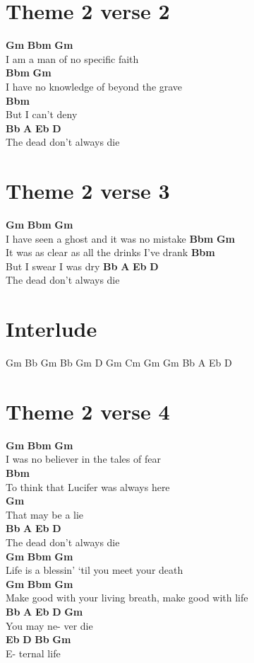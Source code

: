\documentclass{article}
\begin{document}
\section*{Theme 2 verse 2}
\textbf{Gm}     \textbf{Bbm}                \textbf{Gm}\\
I am a man of no specific faith\\
\textbf{Bbm}                     \textbf{Gm}\\
I have no knowledge of beyond the grave\\
\textbf{Bbm}\\
But I can’t deny\\
\textbf{Bb}         \textbf{A}      \textbf{Eb} \textbf{D}\\
The dead don’t always die

\section*{Theme 2 verse 3}
\textbf{Gm}            \textbf{Bbm}                    \textbf{Gm}\\
I have seen a ghost and it was no mistake
\textbf{Bbm}                          \textbf{Gm}\\
It was as clear as all the drinks I’ve drank
\textbf{Bbm}\\
But I swear I was dry
\textbf{Bb}         \textbf{A}      \textbf{Eb} \textbf{D}\\
The dead don’t always die

\section*{Interlude}
Gm     Bb
Gm
Bb     Gm
D
Gm     Cm
Gm
Gm
Bb  A  Eb D

\section*{Theme 2 verse 4}
\textbf{Gm}         \textbf{Bbm}           \textbf{Gm}\\
I was no believer in the tales of fear\\
\textbf{Bbm}\\
To think that Lucifer was always here\\
\textbf{Gm}\\
 That may be a lie\\
 \textbf{Bb}         \textbf{A}      \textbf{Eb} \textbf{D}\\
The dead don’t always die\\
\textbf{Gm}        \textbf{Bbm}                         \textbf{Gm}\\
Life is a blessin’ ‘til you meet your death\\
\textbf{Gm}                    \textbf{Bbm}          \textbf{Gm}\\
Make good with your living breath, make good with life\\
\textbf{Bb}  \textbf{A}   \textbf{Eb}  \textbf{D}   \textbf{Gm}\\
You may ne- ver die\\
\textbf{Eb} \textbf{D}  \textbf{Bb}  \textbf{Gm}\\
E- ternal life
\end{document}

